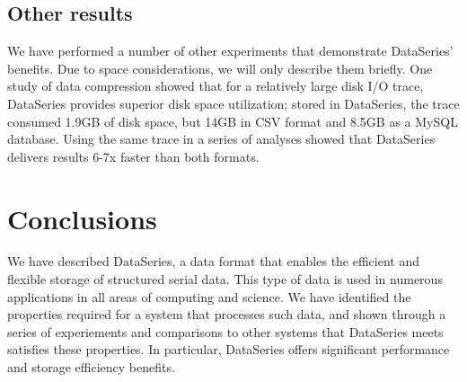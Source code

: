 \documentclass{acm_proc_article-sp}
\begin{document}
\subsection{Other results}\label{sec:otherresults}

We have performed a number of other experiments that demonstrate
DataSeries' benefits. Due to space considerations, we will only
describe them briefly. One study of data compression showed that for a
relatively large disk I/O trace, DataSeries provides superior disk
space utilization; stored in DataSeries, the trace consumed 1.9GB of
disk space, but 14GB in CSV format and 8.5GB as a MySQL
database. Using the same trace in a series of analyses showed that
DataSeries delivers results 6-7x faster than both formats.

\section{Conclusions}\label{sec:conclusions}

We have described DataSeries, a data format that enables the
efficient and flexible storage of structured serial data. This type of
data is used in numerous applications in all areas of computing and
science. We have identified the properties required for a system that
processes such data, and shown through a series of experiements and
comparisons to other systems that DataSeries meets satisfies these
properties. In particular, DataSeries offers significant performance
and storage efficiency benefits.


{\small

}
%
%
\balancecolumns
\end{document}
